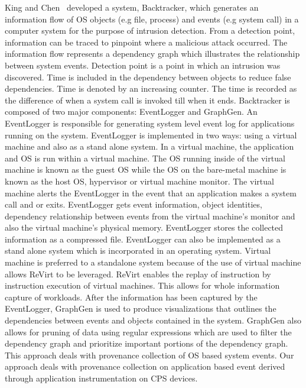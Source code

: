 King and Chen~\cite{King:2003:BI:945445.945467} developed a system, Backtracker, which generates an information flow of OS objects (e.g file, process) and events (e.g system call) in a computer system for the purpose of intrusion detection. From a detection point, information can be traced to pinpoint where a malicious attack occurred. The information flow represents a dependency graph which illustrates the relationship between system events. Detection point is a point in which an intrusion was discovered. Time is included in the dependency between objects to reduce false dependencies. Time is denoted by an increasing counter. The time is recorded as the difference of when a system call is invoked till when it ends. Backtracker is composed of two major components: EventLogger and GraphGen. An EventLogger is responsible for generating system level event log for applications running on the system. EventLogger is implemented in two ways: using a virtual machine and also as a stand alone system. In a virtual machine, the application and OS is run within a virtual machine. The OS running inside of the virtual machine is known as the guest OS while the OS on the bare-metal machine is known as the host OS, hypervisor or virtual machine monitor. The virtual machine alerts the EventLogger in the event that an application makes a system call and or exits. EventLogger gets event information, object identities, dependency relationship between events from the virtual machine's monitor and also the virtual machine's physical memory. EventLogger stores the collected information as a compressed file. EventLogger can also be implemented as a stand alone system which is incorporated in an operating system. Virtual machine is preferred to a standalone system because of the use of virtual machine allows ReVirt to be leveraged. ReVirt enables the replay of instruction by instruction execution of virtual machines. This allows for whole information capture of workloads. After the information has been captured by the EventLogger, GraphGen is used to produce visualizations that outlines the dependencies between events and objects contained in the system. GraphGen also allows for pruning of data using regular expressions which are used to filter the dependency graph and prioritize important portions of the dependency graph. This approach deals with provenance collection of OS based system events. Our approach deals with provenance collection on application based event derived through application instrumentation on CPS devices.





